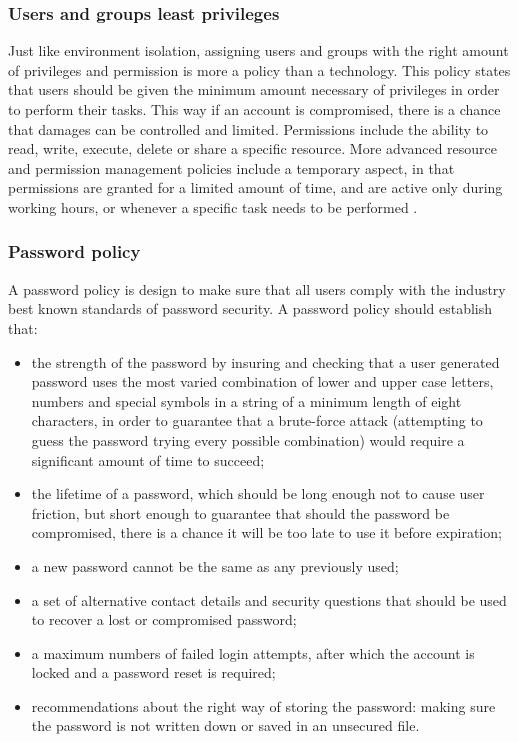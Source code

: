 \subsubsection{Users and groups least privileges}
Just like environment isolation, assigning users and groups with the right
amount of privileges and permission is more a policy than a technology. This
policy states that users should be given the minimum amount necessary of
privileges in order to perform their tasks. This way if an account is
compromised, there is a chance that damages can be controlled and limited.
Permissions include the ability to read, write, execute, delete or share a
specific resource. More advanced resource and permission management policies
include a temporary aspect, in that permissions are granted for a limited amount
of time, and are active only during working hours, or whenever a specific task
needs to be performed \cite{WS15}.

\subsubsection{Password policy}
A password policy is design to make sure that all users comply with the industry
best known standards of password security. A password policy should
establish that:
\begin{itemize}
  \item the strength of the password by insuring and checking that a user
  generated password uses the most varied combination of lower and upper case
  letters, numbers and special symbols in a string of a minimum length of
  eight characters, in order to guarantee that a brute-force attack (attempting
  to guess the password trying every possible combination) would require a
  significant amount of time to succeed;
  \item the lifetime of a password, which should be long enough not to cause
  user friction, but short enough to guarantee that should the password be
  compromised, there is a chance it will be too late to use it before
  expiration;
  \item a new password cannot be the same as any previously used;
  \item a set of alternative contact details and security questions that should
  be used to recover a lost or compromised password;
  \item a maximum numbers of failed login attempts, after which the account is
  locked and a password reset is required;
  \item recommendations about the right way of storing the password: making sure
  the password is not written down or saved in an unsecured file.
\end{itemize}

